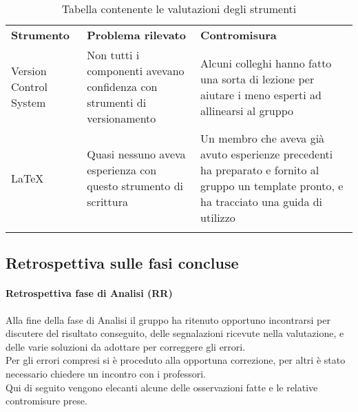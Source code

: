 \documentclass[../piano_di_qualifica.tex]{subfiles}
\begin{document}
\begin{center}
	\begin{longtable}{|p{3cm}|p{4.5cm}|p{4.5cm}|}
		\hline
		\rowcolor{lightgray}
		\textbf{Strumento}                                                       & \textbf{Problema rilevato} & \textbf{Contromisura}                 \\
		Version Control System                                                   &
		Non tutti i componenti avevano confidenza con strumenti di versionamento &
		Alcuni colleghi hanno fatto una sorta di lezione per aiutare i meno esperti ad allinearsi al gruppo                                           \\
		\LaTeX                                                                   &
		Quasi nessuno aveva esperienza con questo strumento di scrittura         &
		Un membro che aveva già avuto esperienze precedenti ha preparato e fornito al gruppo un template pronto, e ha tracciato una guida di utilizzo \\
		\hline
		\rowcolor{white}
		\caption{Tabella contenente le valutazioni degli strumenti}
	\end{longtable}
\end{center}

\subsection{Retrospettiva sulle fasi concluse}
\label{sub:retrospettiva}

\paragraph{Retrospettiva fase di Analisi (RR)}
\label{par:retrospettiva-RR}
Alla fine della fase di Analisi il gruppo ha ritenuto opportuno incontrarsi per discutere del risultato conseguito, delle segnalazioni
ricevute nella valutazione, e delle varie soluzioni da adottare per correggere gli errori.\\
Per gli errori compresi si è proceduto alla opportuna correzione, per altri è stato necessario chiedere un incontro
con i professori. \\
Qui di seguito vengono elecanti alcune delle osservazioni fatte e le relative contromisure prese.\\
\end{document}
